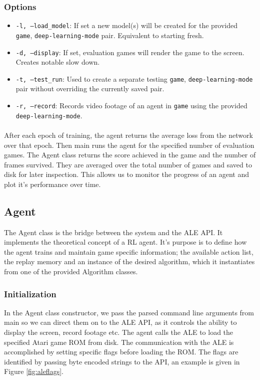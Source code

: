 \subsubsection{Options}
\begin{itemize}
    \item \texttt{-l, --load\_model}: If set a new model(s) will be created for the provided \texttt{game}, \texttt{deep-learning-mode} pair. Equivalent to starting fresh.
    \item \texttt{-d, --display}: If set, evaluation games will render the game to the screen. Creates notable slow down.
    \item \texttt{-t, --test\_run}: Used to create a separate testing \texttt{game}, \texttt{deep-learning-mode} pair without overriding the currently saved pair.
    \item \texttt{-r, --record}: Records video footage of an agent in \texttt{game} using the provided \texttt{deep-learning-mode}.
\end{itemize} \paragraph{}

After each epoch of training, the agent returns the average loss from the network over that epoch. Then main runs the agent for the specified number of evaluation games. The Agent class returns the score achieved in the game and the number of frames survived. They are averaged over the total number of games and saved to disk for later inspection. This allows us to monitor the progress of an agent and plot it's performance over time.

\subsection{Agent}
The Agent class is the bridge between the system and the ALE API. It implements the theoretical concept of a RL agent. It's purpose is to define how the agent trains and maintain game specific information; the available action list, the replay memory and an instance of the desired algorithm, which it instantiates from one of the provided Algorithm classes.

\subsubsection{Initialization}
In the Agent class constructor, we pass the parsed command line arguments from main so we can direct them on to the ALE API, as it controls the ability to display the screen, record footage etc. The agent calls the ALE to load the specified Atari game ROM from disk. The communication with the ALE is accomplished by setting specific flags before loading the ROM. The flags are identified by passing byte encoded strings to the API, an example is given in Figure \ref{fig:aleflags}.

